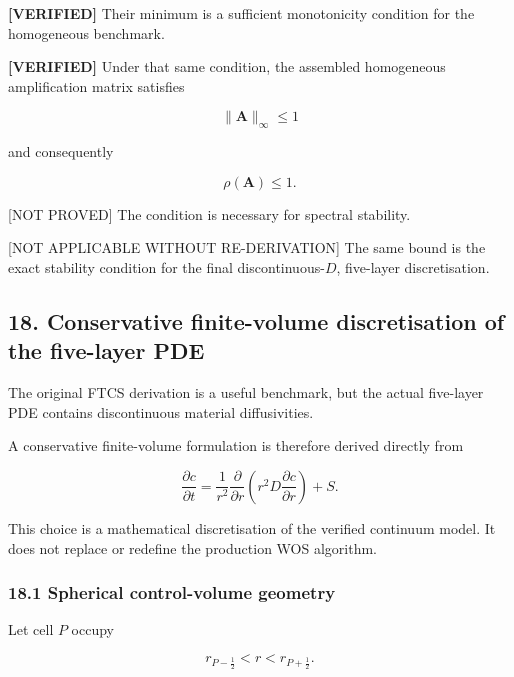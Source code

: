 \documentclass[11pt,a4paper]{article}
\begin{document}
\textbf{[VERIFIED]} Their minimum is a sufficient monotonicity condition for the homogeneous benchmark.

\textbf{[VERIFIED]} Under that same condition, the assembled homogeneous amplification matrix satisfies

\begin{equation}
\|\mathbf A\|_\infty\le1
\tag{TRISO-DIS-581}
\label{eq:triso-dis-581}
\end{equation}

and consequently

\begin{equation}
\rho(\mathbf A)\le1.
\tag{TRISO-DIS-582}
\label{eq:triso-dis-582}
\end{equation}

[NOT PROVED] The condition is necessary for spectral stability.

[NOT APPLICABLE WITHOUT RE-DERIVATION] The same bound is the exact stability condition for the final discontinuous-$D$, five-layer discretisation.

\subsection*{18. Conservative finite-volume discretisation of the five-layer PDE}

The original FTCS derivation is a useful benchmark, but the actual five-layer PDE contains discontinuous material diffusivities.

A conservative finite-volume formulation is therefore derived directly from

\begin{equation}
\frac{\partial c}{\partial t}
=
\frac1{r^2}
\frac{\partial}{\partial r}
\left(
r^2D\frac{\partial c}{\partial r}
\right)
+
S.
\tag{TRISO-FV-100}
\label{eq:triso-fv-100}
\end{equation}

This choice is a mathematical discretisation of the verified continuum model. It does not replace or redefine the production WOS algorithm.

\subsubsection*{18.1 Spherical control-volume geometry}

Let cell $P$ occupy

\begin{equation}
r_{P-\frac12}
<
r
<
r_{P+\frac12}.
\tag{TRISO-FV-101}
\label{eq:triso-fv-101}
\end{equation}
\end{document}
